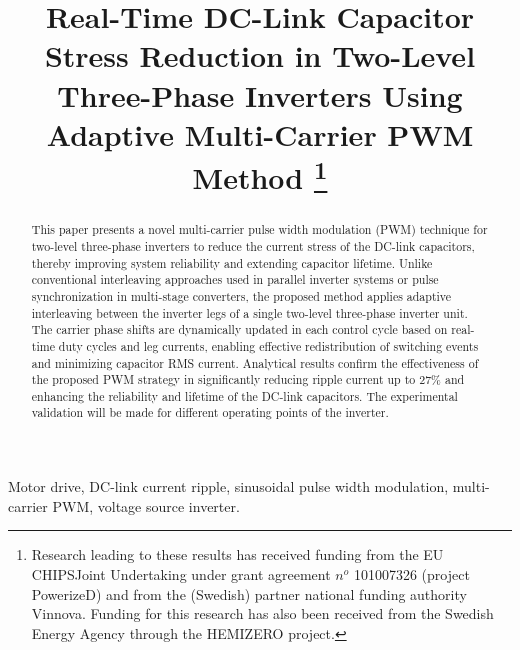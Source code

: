 \documentclass{IPEC2026}
\begin{document}
\title{Real-Time DC-Link Capacitor Stress Reduction in Two-Level Three-Phase Inverters Using Adaptive Multi-Carrier PWM Method
\thanks{Research leading to these results has received funding from the EU CHIPSJoint Undertaking under grant agreement $n^o$ 101007326 (project PowerizeD) and from the (Swedish) partner national funding authority Vinnova. Funding for this research has also been received from the Swedish Energy Agency through the HEMIZERO project.}
}


\maketitle

\begin{abstract}
This paper presents a novel multi-carrier pulse width modulation (PWM) technique for two-level three-phase inverters to reduce the current stress of the DC-link capacitors, thereby improving system reliability and extending capacitor lifetime. 
Unlike conventional interleaving approaches used in parallel inverter systems or pulse synchronization in multi-stage converters, the proposed method applies adaptive interleaving between the inverter legs of a single two-level three-phase inverter unit.
The carrier phase shifts are dynamically updated in each control cycle based on real-time duty cycles and leg currents, enabling effective redistribution of switching events and minimizing capacitor RMS current. 
Analytical results confirm the effectiveness of the proposed PWM strategy in significantly reducing ripple current up to 27\%  and enhancing the reliability and lifetime of the DC-link capacitors. \color{red} The experimental validation will be made for different operating points of the inverter. \color{black}

\end{abstract}

\begin{IEEEkeywords}
 Motor drive, DC-link current ripple, sinusoidal pulse width modulation, multi-carrier PWM, voltage source inverter.
\end{IEEEkeywords}
\end{document}
